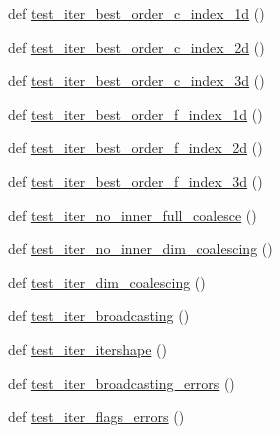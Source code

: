 \begin{DoxyCompactItemize}
\item 
def \hyperlink{namespacenumpy_1_1core_1_1tests_1_1test__nditer_aa3054ed5e359c587f8b3f01a74b8bf86}{test\+\_\+iter\+\_\+best\+\_\+order\+\_\+c\+\_\+index\+\_\+1d} ()
\item 
def \hyperlink{namespacenumpy_1_1core_1_1tests_1_1test__nditer_a4843d628237e0aac034692217e08b13c}{test\+\_\+iter\+\_\+best\+\_\+order\+\_\+c\+\_\+index\+\_\+2d} ()
\item 
def \hyperlink{namespacenumpy_1_1core_1_1tests_1_1test__nditer_a1f217844ca4cecbded62e64a67442f3a}{test\+\_\+iter\+\_\+best\+\_\+order\+\_\+c\+\_\+index\+\_\+3d} ()
\item 
def \hyperlink{namespacenumpy_1_1core_1_1tests_1_1test__nditer_abdb6b651757103c9fff536f16e21229b}{test\+\_\+iter\+\_\+best\+\_\+order\+\_\+f\+\_\+index\+\_\+1d} ()
\item 
def \hyperlink{namespacenumpy_1_1core_1_1tests_1_1test__nditer_a83cf362adae26853f7d329e9153de6ee}{test\+\_\+iter\+\_\+best\+\_\+order\+\_\+f\+\_\+index\+\_\+2d} ()
\item 
def \hyperlink{namespacenumpy_1_1core_1_1tests_1_1test__nditer_a7c30d34982553d2f2ff192e07292cff9}{test\+\_\+iter\+\_\+best\+\_\+order\+\_\+f\+\_\+index\+\_\+3d} ()
\item 
def \hyperlink{namespacenumpy_1_1core_1_1tests_1_1test__nditer_a567c5a26ea8c46c6da2bef982ecb3568}{test\+\_\+iter\+\_\+no\+\_\+inner\+\_\+full\+\_\+coalesce} ()
\item 
def \hyperlink{namespacenumpy_1_1core_1_1tests_1_1test__nditer_a0a02d91691552e233a900279fc7a56cf}{test\+\_\+iter\+\_\+no\+\_\+inner\+\_\+dim\+\_\+coalescing} ()
\item 
def \hyperlink{namespacenumpy_1_1core_1_1tests_1_1test__nditer_a55db471ebefe93c4038c0dbcf4a5ead2}{test\+\_\+iter\+\_\+dim\+\_\+coalescing} ()
\item 
def \hyperlink{namespacenumpy_1_1core_1_1tests_1_1test__nditer_ad35b91c008f139646fe4f52edbe8fe8d}{test\+\_\+iter\+\_\+broadcasting} ()
\item 
def \hyperlink{namespacenumpy_1_1core_1_1tests_1_1test__nditer_ad64b84eb391a9f30149b306e075b0933}{test\+\_\+iter\+\_\+itershape} ()
\item 
def \hyperlink{namespacenumpy_1_1core_1_1tests_1_1test__nditer_a61e037bdfbb500db6a655dd7db1098a3}{test\+\_\+iter\+\_\+broadcasting\+\_\+errors} ()
\item 
def \hyperlink{namespacenumpy_1_1core_1_1tests_1_1test__nditer_a86ef1f3f4f30e50dd9156a6b6aa07ebc}{test\+\_\+iter\+\_\+flags\+\_\+errors} ()

\end{DoxyCompactItemize}
